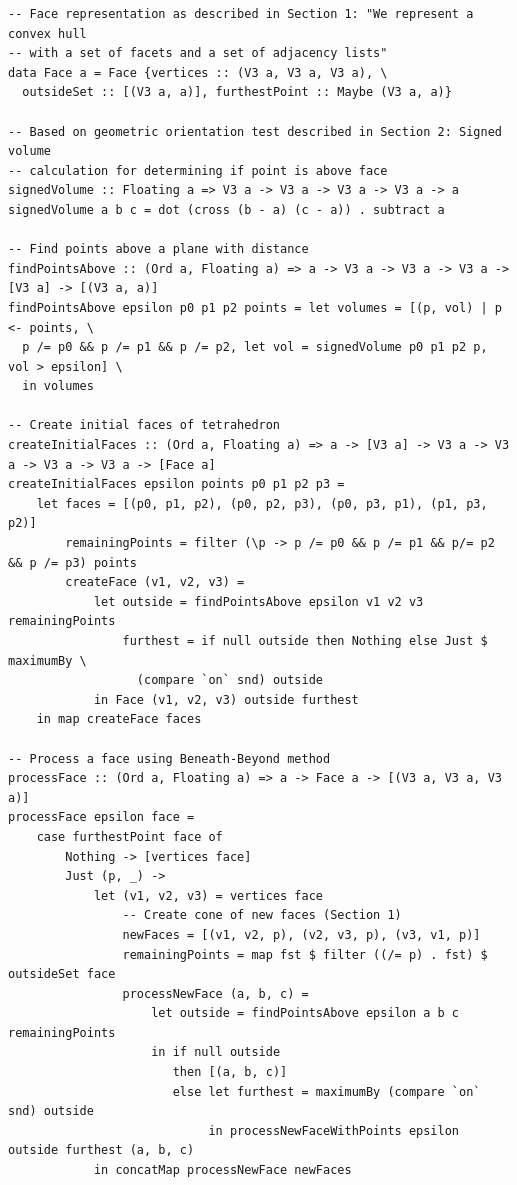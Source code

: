 \documentclass[12pt]{article}
\begin{document}
    \begin{verbatim}
-- Face representation as described in Section 1: "We represent a convex hull
-- with a set of facets and a set of adjacency lists"
data Face a = Face {vertices :: (V3 a, V3 a, V3 a), \
  outsideSet :: [(V3 a, a)], furthestPoint :: Maybe (V3 a, a)}

-- Based on geometric orientation test described in Section 2: Signed volume
-- calculation for determining if point is above face
signedVolume :: Floating a => V3 a -> V3 a -> V3 a -> V3 a -> a
signedVolume a b c = dot (cross (b - a) (c - a)) . subtract a

-- Find points above a plane with distance
findPointsAbove :: (Ord a, Floating a) => a -> V3 a -> V3 a -> V3 a -> [V3 a] -> [(V3 a, a)]
findPointsAbove epsilon p0 p1 p2 points = let volumes = [(p, vol) | p <- points, \
  p /= p0 && p /= p1 && p /= p2, let vol = signedVolume p0 p1 p2 p, vol > epsilon] \
  in volumes

-- Create initial faces of tetrahedron
createInitialFaces :: (Ord a, Floating a) => a -> [V3 a] -> V3 a -> V3 a -> V3 a -> V3 a -> [Face a]
createInitialFaces epsilon points p0 p1 p2 p3 = 
    let faces = [(p0, p1, p2), (p0, p2, p3), (p0, p3, p1), (p1, p3, p2)]
        remainingPoints = filter (\p -> p /= p0 && p /= p1 && p/= p2 && p /= p3) points
        createFace (v1, v2, v3) = 
            let outside = findPointsAbove epsilon v1 v2 v3 remainingPoints
                furthest = if null outside then Nothing else Just $ maximumBy \
                  (compare `on` snd) outside
            in Face (v1, v2, v3) outside furthest
    in map createFace faces

-- Process a face using Beneath-Beyond method
processFace :: (Ord a, Floating a) => a -> Face a -> [(V3 a, V3 a, V3 a)]
processFace epsilon face =
    case furthestPoint face of
        Nothing -> [vertices face]
        Just (p, _) -> 
            let (v1, v2, v3) = vertices face
                -- Create cone of new faces (Section 1)
                newFaces = [(v1, v2, p), (v2, v3, p), (v3, v1, p)]
                remainingPoints = map fst $ filter ((/= p) . fst) $ outsideSet face
                processNewFace (a, b, c) = 
                    let outside = findPointsAbove epsilon a b c remainingPoints
                    in if null outside
                       then [(a, b, c)]
                       else let furthest = maximumBy (compare `on` snd) outside
                            in processNewFaceWithPoints epsilon outside furthest (a, b, c)
            in concatMap processNewFace newFaces



\end{verbatim}
\end{document}
